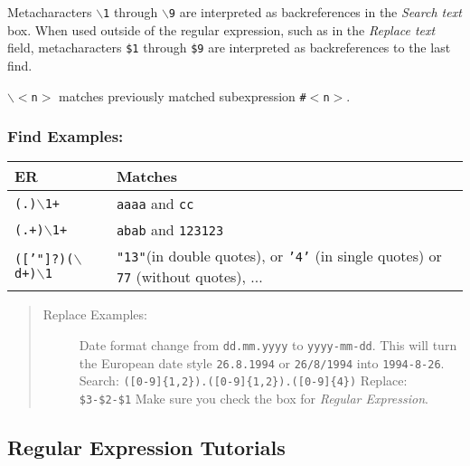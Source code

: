 Metacharacters \texttt{$\backslash$1} through \texttt{$\backslash$9}
are interpreted as backreferences in the \textit{Search text} box. When
used outside of the regular expression, such as in the \textit{Replace
  text} field, metacharacters \texttt{\$1} through \texttt{\$9} are
interpreted as backreferences to the last find.

\texttt{$\backslash$$<$n$>$} matches previously matched subexpression
\texttt{\#$<$n$>$}.


\subsubsection{Find Examples:}

\begin{footnotesize}
  \begin{tabularx}{\textwidth}{>{\hsize=0.3\hsize}X>{\hsize=0.7\hsize}X}\\
    \hline
    \textbf{ER} & \textbf{Matches} \\
    \hline
    \texttt{(.)$\backslash$1+} & \texttt{aaaa} and \texttt{cc} \\
    \texttt{(.+)$\backslash$1+} & \texttt{abab} and \texttt{123123} \\
    \texttt{(['"]?)($\backslash$d+)$\backslash$1} & \texttt{"13"}(in double quotes),
    or \texttt{'4'} (in single quotes) or \texttt{77} (without quotes), ... \\
    \hline
  \end{tabularx}
\end{footnotesize}

\begin{quote}
  \begin{footnotesize}
    \begin{description}
      \item[Replace Examples:]
        Date format change from \texttt{dd.mm.yyyy} to \texttt{yyyy-mm-dd}. This will
        turn the European date style \texttt{26.8.1994} or \texttt{26/8/1994}
        into \texttt{1994-8-26}.
        Search: \texttt{([0-9]\{1,2\}).([0-9]\{1,2\}).([0-9]\{4\})}
        Replace: \texttt{\$3-\$2-\$1}
        Make sure you check the box for \textit{Regular Expression}.
    \end{description}
  \end{footnotesize}
\end{quote}


\subsection{Regular Expression Tutorials}

